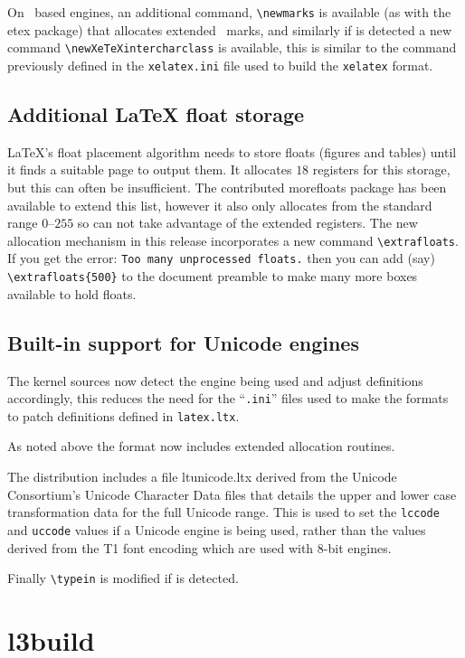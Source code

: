\documentclass{ltnews}
\begin{document}
On \eTeX\ based engines, an additional command, \verb|\newmarks| is available
(as with the \textsf{etex} package) that allocates extended \eTeX\ marks, and
similarly if  is detected a new command
\verb|\newXeTeXintercharclass| is available, this is similar to the command
previously defined in the \texttt{xelatex.ini} file used to build the
\texttt{xelatex} format.

\subsection{Additional \LaTeX{} float storage}

\LaTeX's float placement algorithm needs to store floats (figures and tables)
until it finds a suitable page to output them. It allocates $18$ registers for
this storage, but this can often be insufficient.
 The contributed \textsf{morefloats} package has
been available to extend this list, however it also only allocates from the
standard range $0$--$255$ so can not take advantage of the extended registers.
The new allocation mechanism in this release incorporates a new command
\verb|\extrafloats|. If you get the error:
\mbox{\texttt{Too many unprocessed floats.}}
then you can add (say) \verb|\extrafloats{500}| to the document preamble to
make many more boxes available to hold floats. 


\subsection{Built-in support for Unicode engines}

The kernel sources now detect the engine being used and adjust definitions
accordingly, this reduces the need for the ``\texttt{.ini}'' files used to make
the formats to patch definitions defined in \texttt{latex.ltx}.
 
As noted above the format now includes extended allocation routines.

The distribution includes a file \textsf{ltunicode.ltx} derived from the
Unicode Consortium's Unicode Character Data files that details the upper and
lower case transformation data for the full Unicode range. This is used to set
the \verb|lccode| and \verb|uccode| values if a Unicode engine is being used,
rather than the values derived from the T1 font encoding which are used with
8-bit engines.

Finally \verb|\typein| is modified if  is detected.

\section{l3build}
\end{document}

